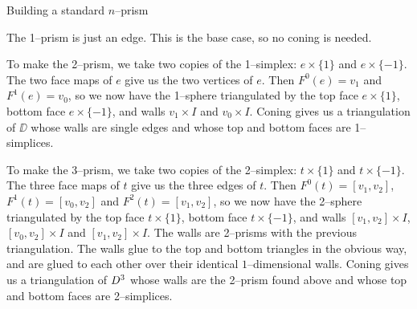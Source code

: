 \begin{algorithm}[h]
	\caption{Building a standard $n$--prism}
	\label{alg:nprism}
\end{algorithm}


The 1--prism is just an edge.
This is the base case, so no coning is needed.

To make the 2--prism, we take two copies of the 1--simplex: $e\times\{1\}$ and $e\times\{-1\}$.
The two face maps of $e$ give us the two vertices of $e$.
Then $F^0(e)=v_1$ and $F^1(e)=v_0$, so we now have the 1--sphere triangulated by the top face $e\times\{1\}$, bottom face $e\times\{-1\}$, and walls $v_1\times I$ and $v_0\times I$.
Coning gives us a triangulation of $\DD$ whose walls are single edges and whose top and bottom faces are 1--simplices.

To make the 3--prism, we take two copies of the 2--simplex: $t\times\{1\}$ and $t\times\{-1\}$.
The three face maps of $t$ give us the three edges of $t$.
Then $F^0(t)=[v_1,v_2]$, $F^1(t)=[v_0,v_2]$ and $F^2(t)=[v_1,v_2]$, so we now have the 2--sphere triangulated by the top face $t\times\{1\}$, bottom face $t\times\{-1\}$, and walls $[v_1,v_2]\times I$, $[v_0,v_2]\times I$ and $[v_1,v_2]\times I$.
The walls are 2--prisms with the previous triangulation.
The walls glue to the top and bottom triangles in the obvious way, and are glued to each other over their identical $1$--dimensional walls.
Coning gives us a triangulation of $D^3$ whose walls are the 2--prism found above and whose top and bottom faces are 2--simplices.

